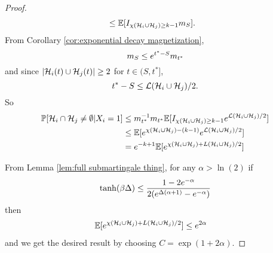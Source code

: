 \begin{proof}
\begin{align}
			&\leq \mathbb{E}[I_{\chi(\mathcal{H}_i \cup \mathcal{H}_j) \geq k - 1} m_S].
		\end{align}
		From Corollary \ref{cor:exponential decay magnetization}, 
		\begin{equation}
			m_S \leq e^{t^* - S} m_{t^*}
		\end{equation}
		and since $|\mathcal{H}_i(t) \cup \mathcal{H}_j(t)| \geq 2$ for $t \in (S, t^*]$,
		\begin{equation}
			t^* - S \leq \mathcal{L}(\mathcal{H}_i \cup \mathcal{H}_j)/2.
		\end{equation}
		So
		\begin{align}
			\prob[\mathcal{H}_i \cap \mathcal{H}_j \neq \emptyset | X_i = 1] %
			&\leq m_{t^*}^{-1} m_{t^*} \expect[\indicator_{\chi(\hist_i \cup \hist_j) \geq k-1} \euler^{\mathcal{L}(\hist_i\cup \hist_j)/2}]\\
			&\leq \expect[\euler^{\chi(\hist_i\cup \hist_j) - (k-1)} \euler^{\mathcal{L}(\hist_i\cup \hist_j)/2}]\\
			&= \euler^{-k + 1} \expect[\euler^{\chi(\hist_i\cup \hist_j) + L(\hist_i\cup \hist_j)/2} ]
		\end{align}

		From Lemma \ref{lem:full submartingale thing}, for any $\alpha > \ln(2)$ if
		\begin{equation}
			\tanh(\beta\Delta) \leq \frac{1-2e^{-\alpha}}{2(e^{\Delta(\alpha+1)} - e^{-\alpha})}
		\end{equation}
		then
		\begin{align}
			\mathbb{E}[e^{\chi(\mathcal{H}_i\cup \mathcal{H}_j) + L(\mathcal{H}_i\cup \mathcal{H}_j)/2} ] &\leq e^{2\alpha}
		\end{align}
		and we get the desired result by choosing $C = \exp(1 + 2\alpha)$.
	\end{proof}